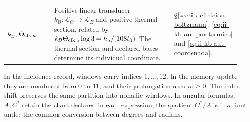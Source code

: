 \begin{longtable}{@{}>{\raggedright\arraybackslash}p{0.19\linewidth}
                    >{\raggedright\arraybackslash}p{0.49\linewidth}
                    >{\raggedright\arraybackslash}p{0.27\linewidth}@{}}
\(k_B\), \(\Theta_{{\rm clk},a}\)
& Positive linear transducer
  \(k_B:\mathcal L_\Theta\to\mathcal L_E\) and positive thermal
  section, related by
  \(k_B\Theta_{{\rm clk},a}\log3=h_a/(108t_0)\).
  The thermal section and declared bases determine its
  individual coordinate.
& \S\ref{sec:ii-definicion-boltzmann};
  \eqref{eq:ii-kb-aut-par-termico} and
  \eqref{eq:ii-kb-aut-coordenada}.\\

\end{longtable}
\endgroup

In the incidence record, windows carry indices \(1,\ldots,12\).
In the memory update they are numbered from \(0\) to \(11\), and
their prolongation uses \(m\geq0\). The index shift preserves
the same partition into nonadic windows. In angular formulas,
\(A,C^*\) retain the chart declared in each expression; the quotient
\(C^*/A\) is invariant under the common conversion between degrees and radians.
